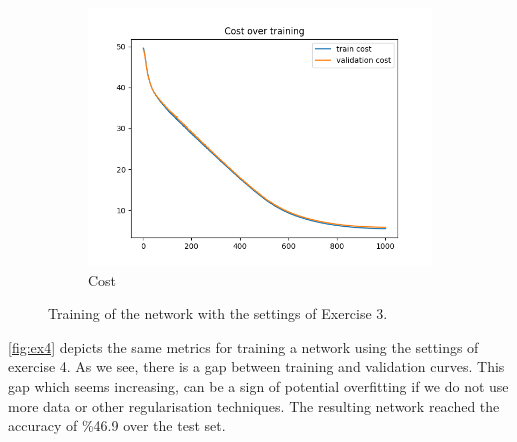 \documentclass[a4paper]{article}
\begin{document}
\begin{figure}[h]
\begin{subfigure}{0.3\textwidth}
		\includegraphics[width=\linewidth]{images/1000_it_default_cost.png}
		\caption{Cost}
	\end{subfigure}
	\caption{Training of the network with the settings of Exercise 3.}
	\label{fig:ex3}
\end{figure}



\autoref{fig:ex4} depicts the same metrics for training a network using the settings of exercise 4. As we see, there is a gap between training and validation curves. This gap which seems increasing, can be a sign of potential overfitting if we do not use more data or other regularisation techniques. The resulting network reached the accuracy of \%46.9 over the test set.
\end{document}
